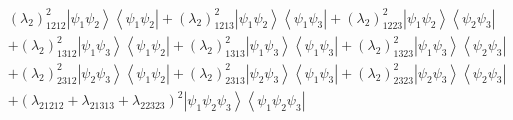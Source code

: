 \documentclass[aps,preprint]{revtex4}%
\begin{document}
\begin{align}
& \left(  \lambda_{2}\right)  _{1212}^{2}\left\vert \psi_{1}\psi
_{2}\right\rangle \left\langle \psi_{1}\psi_{2}\right\vert +\left(
\lambda_{2}\right)  _{1213}^{2}\left\vert \psi_{1}\psi_{2}\right\rangle
\left\langle \psi_{1}\psi_{3}\right\vert +\left(  \lambda_{2}\right)
_{1223}^{2}\left\vert \psi_{1}\psi_{2}\right\rangle \left\langle \psi_{2}%
\psi_{3}\right\vert \nonumber\\
& +\left(  \lambda_{2}\right)  _{1312}^{2}\left\vert \psi_{1}\psi
_{3}\right\rangle \left\langle \psi_{1}\psi_{2}\right\vert +\left(
\lambda_{2}\right)  _{1313}^{2}\left\vert \psi_{1}\psi_{3}\right\rangle
\left\langle \psi_{1}\psi_{3}\right\vert +\left(  \lambda_{2}\right)
_{1323}^{2}\left\vert \psi_{1}\psi_{3}\right\rangle \left\langle \psi_{2}%
\psi_{3}\right\vert \nonumber\\
& +\left(  \lambda_{2}\right)  _{2312}^{2}\left\vert \psi_{2}\psi
_{3}\right\rangle \left\langle \psi_{1}\psi_{2}\right\vert +\left(
\lambda_{2}\right)  _{2313}^{2}\left\vert \psi_{2}\psi_{3}\right\rangle
\left\langle \psi_{1}\psi_{3}\right\vert +\left(  \lambda_{2}\right)
_{2323}^{2}\left\vert \psi_{2}\psi_{3}\right\rangle \left\langle \psi_{2}%
\psi_{3}\right\vert \nonumber\\
& +\left(  \lambda_{21212}+\lambda_{21313}+\lambda_{22323}\right)
^{2}\left\vert \psi_{1}\psi_{2}\psi_{3}\right\rangle \left\langle \psi_{1}%
\psi_{2}\psi_{3}\right\vert
\end{align}


\bigskip
\end{document}
